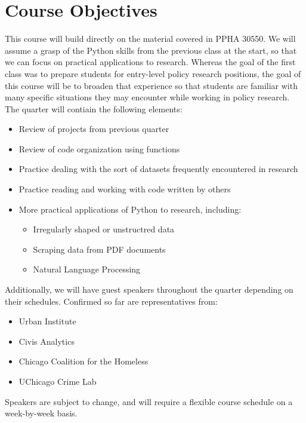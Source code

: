 \documentclass{article}
\begin{document}
\section*{Course Objectives}
This course will build directly on the material covered in PPHA 30550.  We will assume a grasp of the Python skills from the previous class at the start, so that we can focus on practical applications to research.  Whereas the goal of the first class was to prepare students for entry-level policy research positions, the goal of this course will be to broaden that experience so that students are familiar with many specific situations they may encounter while working in policy research.  The quarter will contiain the following elements:

\begin{itemize}
	\item Review of projects from previous quarter
	\item Review of code organization using functions
	\item Practice dealing with the sort of datasets frequently encountered in research
	\item Practice reading and working with code written by others
	\item More practical applications of Python to research, including:
	\begin{itemize}
		\item Irregularly shaped or unstructred data
		\item Scraping data from PDF documents
		\item Natural Language Processing
	\end{itemize}
\end{itemize}

\noindent Additionally, we will have guest speakers throughout the quarter depending on their schedules.  Confirmed so far are representatives from:

\begin{itemize}
	\item Urban Institute
	\item Civis Analytics
	\item Chicago Coalition for the Homeless
	\item UChicago Crime Lab
\end{itemize}

\noindent Speakers are subject to change, and will require a flexible course schedule on a week-by-week basis.

\end{document}
